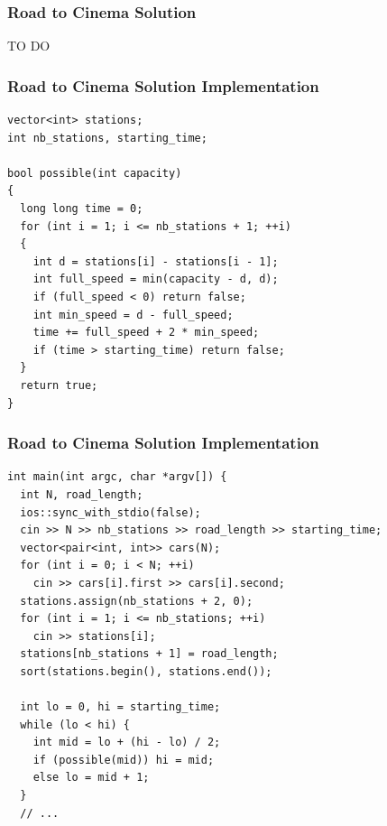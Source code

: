 \documentclass{beamer}
\newcommand{\codeforceslink}[2]{CodeForces (http://www.codeforces.com)
  problem: \href{#2}{\textcolor{blue}{#1}.}}
\newcounter{exo}
\newcommand{\exo}{
  \addtocounter{exo}{1}
  Exercice \arabic{exo}
}
\begin{document}
\fi


\ifanswers

\begin{frame}%
\frametitle{Road to Cinema Solution}

TO DO

\end{frame}

\begin{frame}[containsverbatim]
\frametitle{Road to Cinema Solution Implementation}
\scriptsize

\begin{lstlisting}[mathescape]
vector<int> stations;
int nb_stations, starting_time;

bool possible(int capacity)
{
  long long time = 0;
  for (int i = 1; i <= nb_stations + 1; ++i)
  {
    int d = stations[i] - stations[i - 1];
    int full_speed = min(capacity - d, d);
    if (full_speed < 0) return false;
    int min_speed = d - full_speed;
    time += full_speed + 2 * min_speed;
    if (time > starting_time) return false;
  }
  return true;
}
\end{lstlisting}

\end{frame}

\begin{frame}[containsverbatim]
\frametitle{Road to Cinema Solution Implementation}
\scriptsize

\begin{lstlisting}[mathescape]
int main(int argc, char *argv[]) {
  int N, road_length;
  ios::sync_with_stdio(false);
  cin >> N >> nb_stations >> road_length >> starting_time;
  vector<pair<int, int>> cars(N);
  for (int i = 0; i < N; ++i)
    cin >> cars[i].first >> cars[i].second;
  stations.assign(nb_stations + 2, 0);
  for (int i = 1; i <= nb_stations; ++i)
    cin >> stations[i];
  stations[nb_stations + 1] = road_length;
  sort(stations.begin(), stations.end());

  int lo = 0, hi = starting_time;
  while (lo < hi) {
    int mid = lo + (hi - lo) / 2;
    if (possible(mid)) hi = mid;
    else lo = mid + 1;
  }
  // ...
\end{lstlisting}

\end{frame}
\end{document}
